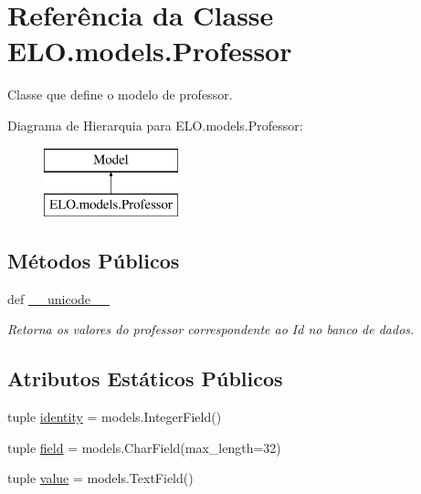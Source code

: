 \hypertarget{classELO_1_1models_1_1Professor}{\section{Referência da Classe E\-L\-O.\-models.\-Professor}
\label{classELO_1_1models_1_1Professor}
}


Classe que define o modelo de professor.  


Diagrama de Hierarquia para E\-L\-O.\-models.\-Professor\-:\begin{figure}[H]
\begin{center}
\leavevmode
\includegraphics[height=2.000000cm]{d5/d93/classELO_1_1models_1_1Professor}
\end{center}
\end{figure}
\subsection*{Métodos Públicos}
\begin{DoxyCompactItemize}
\item 
def \hyperlink{classELO_1_1models_1_1Professor_aefc9d63d429e19ec3487a7879879f29d}{\-\_\-\-\_\-unicode\-\_\-\-\_\-}
\begin{DoxyCompactList}\small\item\em Retorna os valores do professor correspondente ao Id no banco de dados. \end{DoxyCompactList}\end{DoxyCompactItemize}
\subsection*{Atributos Estáticos Públicos}
\begin{DoxyCompactItemize}
\item 
tuple \hyperlink{classELO_1_1models_1_1Professor_a314012619a14c0319c86ba52b6beeb2f}{identity} = models.\-Integer\-Field()
\item 
tuple \hyperlink{classELO_1_1models_1_1Professor_aaf0638dbb44d27f5acadeed376afafa1}{field} = models.\-Char\-Field(max\-\_\-length=32)
\item 
tuple \hyperlink{classELO_1_1models_1_1Professor_abfa283169333876d02cf63886ca872e6}{value} = models.\-Text\-Field()
\end{DoxyCompactItemize}


